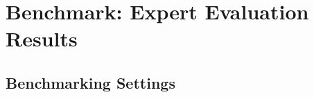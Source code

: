 \documentclass{llmxive}
\begin{document}
 

\section{Benchmark: Expert Evaluation Results}






\subsection{Benchmarking Settings}
\end{document}
